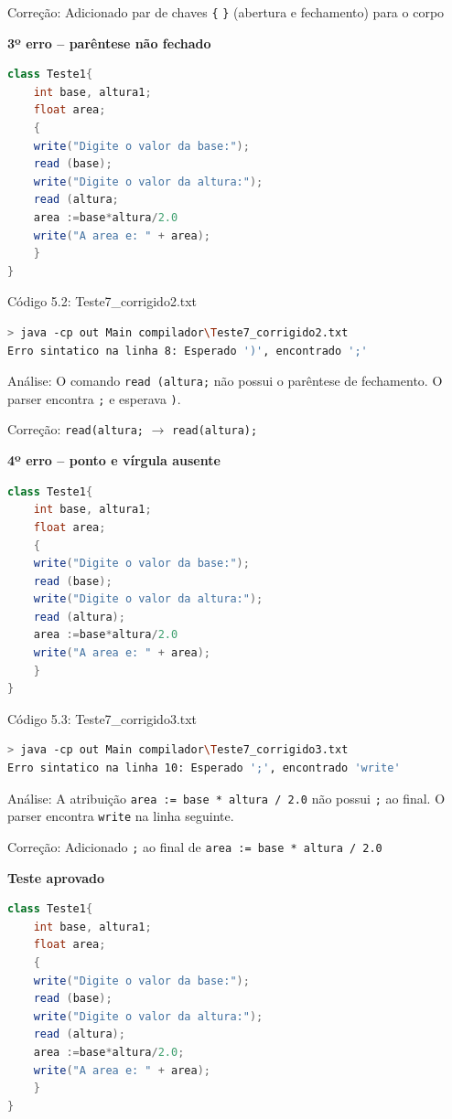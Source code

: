 \documentclass[12pt,a4paper]{article}
\begin{document}
Correção: Adicionado par de chaves \texttt{\{} \texttt{\}} (abertura e fechamento) para o corpo

\textbf{3º erro -- parêntese não fechado}

\begin{lstlisting}[language=Java]
class Teste1{
    int base, altura1;
    float area;
    {
    write("Digite o valor da base:");
    read (base);
    write("Digite o valor da altura:");
    read (altura;
    area :=base*altura/2.0
    write("A area e: " + area);
    }
}
\end{lstlisting}

Código 5.2: Teste7\_corrigido2.txt

\begin{lstlisting}[language=bash]
> java -cp out Main compilador\Teste7_corrigido2.txt
Erro sintatico na linha 8: Esperado ')', encontrado ';'
\end{lstlisting}

Análise: O comando \texttt{read (altura;} não possui o parêntese de fechamento. O parser encontra \texttt{;} e esperava \texttt{)}.

Correção: \texttt{read(altura;} $\to$ \texttt{read(altura);}

\textbf{4º erro -- ponto e vírgula ausente}

\begin{lstlisting}[language=Java]
class Teste1{
    int base, altura1;
    float area;
    {
    write("Digite o valor da base:");
    read (base);
    write("Digite o valor da altura:");
    read (altura);
    area :=base*altura/2.0
    write("A area e: " + area);
    }
}
\end{lstlisting}

Código 5.3: Teste7\_corrigido3.txt

\begin{lstlisting}[language=bash]
> java -cp out Main compilador\Teste7_corrigido3.txt
Erro sintatico na linha 10: Esperado ';', encontrado 'write'
\end{lstlisting}

Análise: A atribuição \texttt{area := base * altura / 2.0} não possui \texttt{;} ao final. O parser encontra \texttt{write} na linha seguinte.

Correção: Adicionado \texttt{;} ao final de \texttt{area := base * altura / 2.0}

\textbf{Teste aprovado}

\begin{lstlisting}[language=Java]
class Teste1{
    int base, altura1;
    float area;
    {
    write("Digite o valor da base:");
    read (base);
    write("Digite o valor da altura:");
    read (altura);
    area :=base*altura/2.0;
    write("A area e: " + area);
    }
}
\end{lstlisting}
\end{document}
